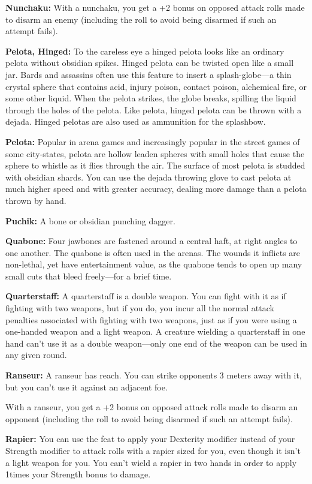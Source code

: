 \textbf{Nunchaku:} With a nunchaku, you get a +2 bonus on opposed attack rolls made to disarm an enemy (including the roll to avoid being disarmed if such an attempt fails). 

\textbf{Pelota, Hinged:} To the careless eye a hinged pelota looks like an ordinary pelota without obsidian spikes. Hinged pelota can be twisted open like a small jar. Bards and assassins often use this feature to insert a splash-globe---a thin crystal sphere that contains acid, injury poison, contact poison, alchemical fire, or some other liquid. When the pelota strikes, the globe breaks, spilling the liquid through the holes of the pelota. Like pelota, hinged pelota can be thrown with a dejada. Hinged pelotas are also used as ammunition for the splashbow.

\textbf{Pelota:} Popular in arena games and increasingly popular in the street games of some city-states, pelota are hollow leaden spheres with small holes that cause the sphere to whistle as it flies through the air. The surface of most pelota is studded with obsidian shards. You can use the dejada throwing glove to cast pelota at much higher speed and with greater accuracy, dealing more damage than a pelota thrown by hand.

\textbf{Puchik:} A bone or obsidian punching dagger.

\textbf{Quabone:} Four jawbones are fastened around a central haft, at right angles to one another. The quabone is often used in the arenas. The wounds it inflicts are non-lethal, yet have entertainment value, as the quabone tends to open up many small cuts that bleed freely---for a brief time.

\textbf{Quarterstaff:} A quarterstaff is a double weapon. You can fight with it as if fighting with two weapons, but if you do, you incur all the normal attack penalties associated with fighting with two weapons, just as if you were using a one-handed weapon and a light weapon. A creature wielding a quarterstaff in one hand can't use it as a double weapon---only one end of the weapon can be used in any given round. 

\textbf{Ranseur:} A ranseur has reach. You can strike opponents 3 meters away with it, but you can't use it against an adjacent foe.

With a ranseur, you get a +2 bonus on opposed attack rolls made to disarm an opponent (including the roll to avoid being disarmed if such an attempt fails). 

\textbf{Rapier:} You can use the  feat to apply your Dexterity modifier instead of your Strength modifier to attack rolls with a rapier sized for you, even though it isn't a light weapon for you. You can't wield a rapier in two hands in order to apply 1\onehalf times your Strength bonus to damage. 

